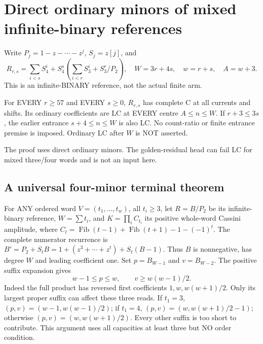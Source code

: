 \section{Direct ordinary minors of mixed infinite-binary references}
Write $P_j=1-z-\cdots-z^j$, $S_j=z[j]$, and
\[
 R_{r,s}=\sum_{i<s}S_4^i+S_4^s\left(\sum_{i<r}S_3^i+S_3^r/P_2\right),
 \quad W=3r+4s,\quad w=r+s,\quad A=w+3.
\]
This is an infinite-BINARY reference, not the actual finite arm.
\begin{theorem}
For EVERY $r\ge57$ and EVERY $s\ge0$, $R_{r,s}$ has complete C
at all currents and shifts. Its ordinary coefficients are LC at
EVERY centre $A\le n\le W$. If $r+3\le3s$, the earlier entrance
$s+4\le n\le W$ is also LC. No count-ratio or finite entrance
premise is imposed. Ordinary LC after $W$ is NOT asserted.
\end{theorem}
The proof uses direct ordinary minors. The golden-residual head
can fail LC for mixed three/four words and is not an input here.

\subsection{A universal four-minor terminal theorem}
For ANY ordered word $V=(t_1,\ldots,t_w)$, all $t_i\ge3$, let
$R=B/P_2$ be its infinite-binary reference, $W=\sum t_i$, and
$K=\prod_i C_{t_i}$ its positive whole-word Cassini amplitude,
where $C_t=\operatorname{Fib}(t-1)+\operatorname{Fib}(t+1)-1-(-1)^t$.
The complete numerator recurrence is
$B'=P_2+S_tB=1+(z^3+\cdots+z^t)+S_t(B-1)$.
Thus $B$ is nonnegative, has degree $W$ and leading coefficient one.
Set $p=B_{W-1}$ and $v=B_{W-2}$. The positive suffix expansion gives
\[
 w-1\le p\le w,\qquad v\ge w(w-1)/2.                 \tag{1}
\]
Indeed the full product has reversed first coefficients
$1,w,w(w+1)/2$. Only its largest proper suffix can affect these
three reads. If $t_1=3$, $(p,v)=(w-1,w(w-1)/2)$;
if $t_1=4$, $(p,v)=(w,w(w+1)/2-1)$; otherwise
$(p,v)=(w,w(w+1)/2)$. Every other suffix is too short to contribute.
This argument uses all capacities at least three but NO order condition.

